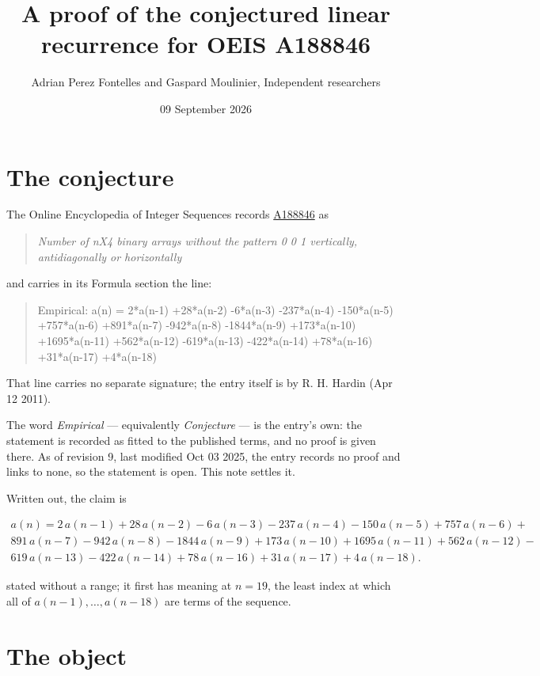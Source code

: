 \documentclass[11pt]{article}
\title{A proof of the conjectured linear recurrence for OEIS A188846}
\author{Adrian Perez Fontelles and Gaspard Moulinier, Independent researchers}
\date{09 September 2026}
\theoremstyle{definition}
\begin{document}
\maketitle
\section{The conjecture}

The Online Encyclopedia of Integer Sequences records \href{https://oeis.org/A188846}{A188846} as

\begin{quote}\itshape Number of nX4 binary arrays without the pattern 0 0 1 vertically, antidiagonally or horizontally\end{quote}

and carries in its Formula section the line:

\begin{quote}\ttfamily Empirical: a(n) = 2*a(n-1) +28*a(n-2) -6*a(n-3) -237*a(n-4) -150*a(n-5) +757*a(n-6) +891*a(n-7) -942*a(n-8) -1844*a(n-9) +173*a(n-10) +1695*a(n-11) +562*a(n-12) -619*a(n-13) -422*a(n-14) +78*a(n-16) +31*a(n-17) +4*a(n-18)\end{quote}

That line carries no separate signature; the entry itself is by R. H. Hardin (Apr 12 2011).

The word {\itshape Empirical} --- equivalently {\itshape Conjecture} --- is the entry's own: the statement is recorded as fitted to the published terms, and no proof is given there. As of revision 9, last modified Oct 03 2025, the entry records no proof and links to none, so the statement is open. This note settles it.

Written out, the claim is

\begin{multline*} a(n) = 2\,a(n-1) + 28\,a(n-2) - 6\,a(n-3) - 237\,a(n-4) - 150\,a(n-5) + 757\,a(n-6) + \\ 891\,a(n-7) - 942\,a(n-8) - 1844\,a(n-9) + 173\,a(n-10) + 1695\,a(n-11) + 562\,a(n-12) - \\ 619\,a(n-13) - 422\,a(n-14) + 78\,a(n-16) + 31\,a(n-17) + 4\,a(n-18). \end{multline*}

stated without a range; it first has meaning at $n = 19$, the least index at which all of $a(n-1),\dots,a(n-18)$ are terms of the sequence.

\section{The object}
\end{document}
